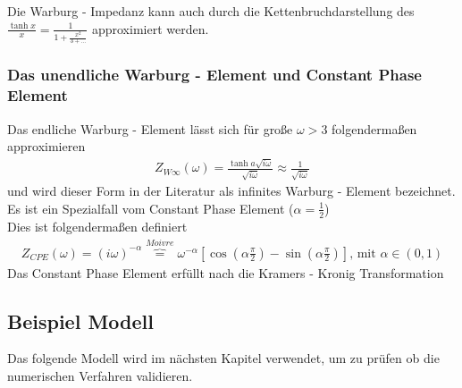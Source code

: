 \begin{bem}
	Die Warburg - Impedanz kann auch durch die Kettenbruchdarstellung des $\frac{\tanh{x}}{x} = \frac{1}{1 + \frac{x^2}{3+...} }$ approximiert werden. \cite{MacDonald2005}
\end{bem}

\subsubsection{Das unendliche Warburg - Element und Constant Phase Element}
Das endliche Warburg - Element lässt sich für große $\omega > 3$ folgendermaßen approximieren
\begin{align}
	Z_{W \infty}(\omega) = \frac{\tanh{a \sqrt{i \omega}}}{\sqrt{i \omega}}  \approx \frac{1}{\sqrt{i \omega}}
\end{align} 
und wird dieser Form in der Literatur \cite{MacDonald2005} als infinites Warburg - Element bezeichnet. Es ist ein Spezialfall vom Constant Phase Element ($\alpha = \frac{1}{2}$)\\
Dies ist folgendermaßen definiert
\begin{align}
	Z_{CPE}(\omega) = {(i \omega)}^{-\alpha} \overbrace{=}^{Moivre} \omega^{-\alpha} \left[\cos(\alpha \frac{\pi}{2}) - \sin(\alpha \frac{\pi}{2}) \right] \text{, mit } \alpha  \in (0, 1)
\end{align}
Das Constant Phase Element erfüllt nach \cite{Raistrick1977} die Kramers - Kronig Transformation 

\subsection{Beispiel Modell}\label{mod:bsp}
Das folgende Modell wird im nächsten Kapitel verwendet, um zu prüfen ob die numerischen Verfahren validieren.

